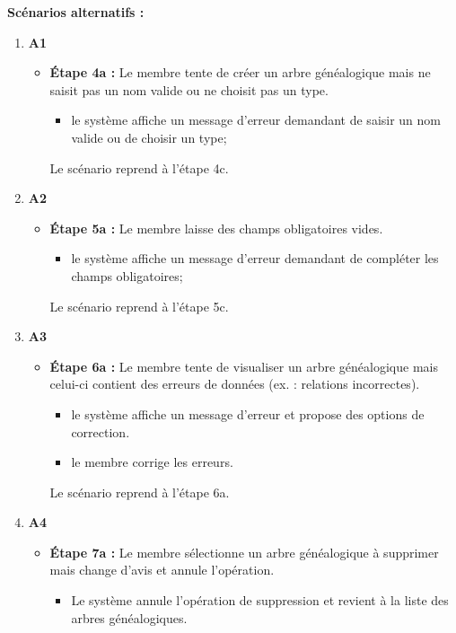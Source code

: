 \textbf{Scénarios alternatifs :}

\begin{enumerate}
    \item \textbf{A1}
    \begin{itemize}
        \item \textbf{Étape 4a :} Le membre tente de créer un arbre
          généalogique mais ne saisit pas un nom valide ou ne choisit pas un type.
        \begin{itemize}
            \item le système affiche un message d'erreur demandant de saisir
              un nom valide ou de choisir un type;
        \end{itemize}
        Le scénario reprend à l'étape 4c.
    \end{itemize}

    \item \textbf{A2}
    \begin{itemize}
        \item \textbf{Étape 5a :} Le membre laisse des champs obligatoires vides.
        \begin{itemize}
            \item le système affiche un message d'erreur demandant de compléter les champs obligatoires;
        \end{itemize}
        Le scénario reprend à l'étape 5c.
    \end{itemize}

  \item \textbf{A3}
    \begin{itemize}
      \item \textbf{Étape 6a :} Le membre tente de visualiser un arbre
        généalogique mais celui-ci contient des erreurs de données (ex. : relations incorrectes).
        \begin{itemize}
          \item le système affiche un message d'erreur et propose des options de correction.
          \item le membre corrige les erreurs.
        \end{itemize}
        Le scénario reprend à l'étape 6a.
    \end{itemize}

    \item \textbf{A4}
    \begin{itemize}
        \item \textbf{Étape 7a :} Le membre sélectionne un arbre généalogique à supprimer mais change d'avis et annule l'opération.
        \begin{itemize}
            \item Le système annule l'opération de suppression et revient à la liste des arbres généalogiques.
        \end{itemize}
    \end{itemize}


\end{enumerate}

